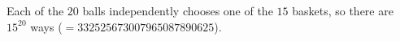 Each of the $20$ balls independently chooses one of the $15$ baskets, so there are $\boxed{15^{20}}$ ways ($=332525673007965087890625$).
